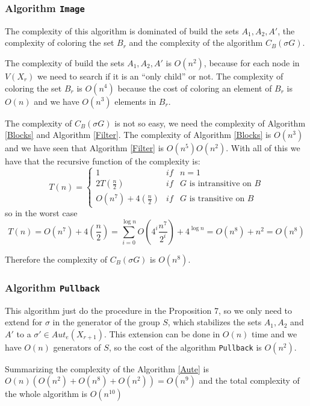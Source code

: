 \documentclass[12pt,a4paper]{book}
\theoremstyle{plain}
\theoremstyle{definition}
\theoremstyle{remark}
\begin{document}
 \subsubsection{Algorithm \texttt{Image}}
 The complexity of this algorithm is dominated  of build the sets $A_1, A_2, A'$, the complexity of coloring the set $B_r$ and 
 the complexity of the algorithm \texttt{$C_B(\sigma G)$}. 
 
 The complexity of build the sets $A_1, A_2, A'$ is $O(n^2)$, because for each 
 node in $V(X_r)$ we need to search if it is an ``only child'' or not. The complexity of coloring the set $B_r$ is $O(n^4)$ because the 
 cost of coloring an element of $B_r$ is $O(n)$ and we have $O(n^3)$ elements in $B_r$.
 
 The complexity of \texttt{$C_B(\sigma G)$} is not so easy, we need the complexity of 
 Algorithm \ref{Blocks} and Algorithm \ref{Filter}. The complexity of Algorithm \ref{Blocks} is $O(n^3)$ \cite{LaMi85} and we have seen 
 that Algorithm \ref{Filter} is $O(n^5)O(n^2)$. With all of this we have that the recursive function of the complexity is:
 \[
  T(n) = \left\lbrace \begin{array}{lcl} 1 & if & n = 1 \\ 2 T\left( \frac{n}{2} \right) & if & G \mbox{ is intransitive on } B \\
                       O(n^7) + 4 \left(\frac{n}{2} \right) & if & G \mbox{ is transitive on } B
                      \end{array} \right. 
 \]
so in the worst case 
\[
 T(n) = O(n^7) + 4 \left( \frac{n}{2} \right) = \sum_{i=0}^{\log n}  O \left( 4^i \frac{n^7}{2^i} \right) + 4^{\log n} =O\left( 
 n^8 \right) + n^2 = O( n^8)
\]

Therefore the complexity of \texttt{$C_B( \sigma G)$} is $O \left( n^8 \right)$.
 
 \subsubsection{Algorithm \texttt{Pullback}}

 This algorithm just do the procedure in the Proposition 7, so we only need to extend for $\sigma$ in the generator of the group $S$, which  
 stabilizes the sets $A_1, A_2$ and $A'$ to a $\sigma' \in Aut_e (X_{r+1})$. This extension can be done in $O(n)$ time and we have 
  $O(n)$ generators of $S$, so the cost of the algorithm \texttt{Pullback} is $O(n^2)$.

 Summarizing the complexity of the Algorithm \ref{Aute} is $O(n) \left( O(n^2) + O(n^8) + O(n^2) \right) = O( n^9)$ and the total  complexity
  of the whole  algorithm is $O(n^{10})$
\end{document}
